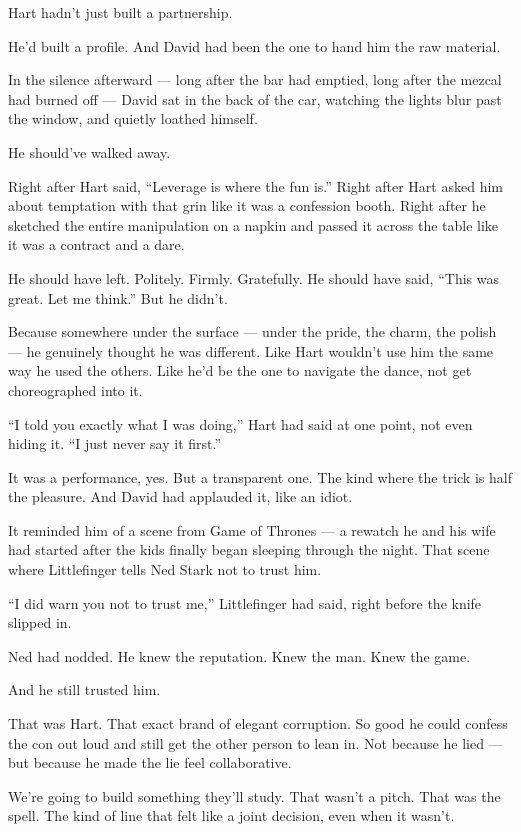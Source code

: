 Hart hadn’t just built a partnership.

He’d built a profile.
And David had been the one to hand him the raw material.

In the silence afterward — long after the bar had emptied, long after the mezcal had burned off — David 
sat in the back of the car, watching the lights blur past the window, and quietly loathed himself.

He should’ve walked away.

Right after Hart said, “Leverage is where the fun is.”
Right after Hart asked him about temptation with that grin like it was a confession booth.
Right after he sketched the entire manipulation on a napkin and passed it across the table like it was 
a contract and a dare.

He should have left. Politely. Firmly. Gratefully.
He should have said, “This was great. Let me think.”
But he didn’t.

Because somewhere under the surface — under the pride, the charm, the polish — he genuinely thought he was different.
Like Hart wouldn’t use him the same way he used the others.
Like he’d be the one to navigate the dance, not get choreographed into it.

“I told you exactly what I was doing,” Hart had said at one point, not even hiding it.
“I just never say it first.”

It was a performance, yes. But a transparent one. The kind where the trick is half the pleasure.
And David had applauded it, like an idiot.

It reminded him of a scene from Game of Thrones — a rewatch he and his wife had started after the kids 
finally began sleeping through the night.
That scene where Littlefinger tells Ned Stark not to trust him.

“I did warn you not to trust me,” Littlefinger had said, right before the knife slipped in.

Ned had nodded. He knew the reputation. Knew the man. Knew the game.

And he still trusted him.

That was Hart. That exact brand of elegant corruption.
So good he could confess the con out loud and still get the other person to lean in.
Not because he lied — but because he made the lie feel collaborative.

We’re going to build something they’ll study.
That wasn’t a pitch. That was the spell.
The kind of line that felt like a joint decision, even when it wasn’t.

